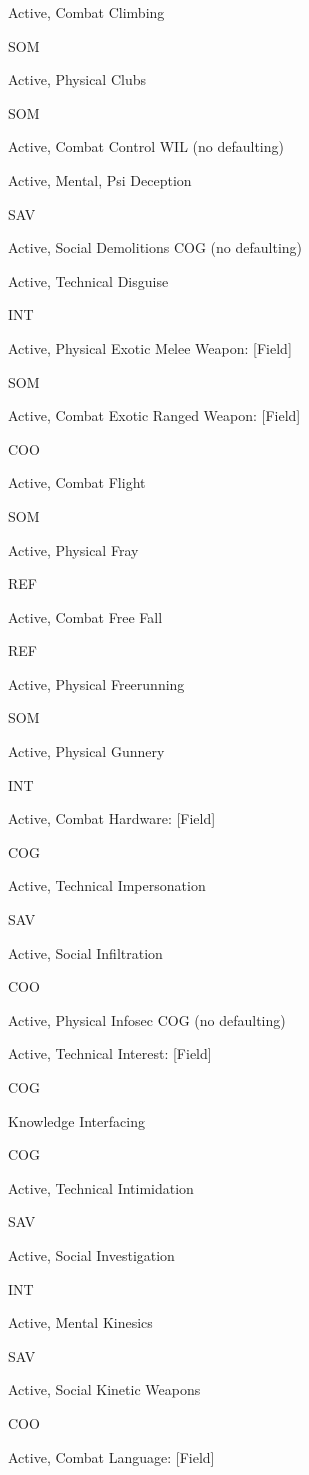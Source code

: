 Active, Combat
Climbing

SOM

Active, Physical
Clubs

SOM

Active, Combat
Control
WIL (no defaulting)

Active, Mental, Psi
Deception

SAV

Active, Social
Demolitions
COG (no defaulting)

Active, Technical
Disguise

INT

Active, Physical
Exotic Melee Weapon: [Field]

SOM

Active, Combat
Exotic Ranged Weapon: [Field]

COO

Active, Combat
Flight

SOM

Active, Physical
Fray

REF

Active, Combat
Free Fall

REF

Active, Physical
Freerunning

SOM

Active, Physical
Gunnery

INT

Active, Combat
Hardware: [Field]

COG

Active, Technical
Impersonation

SAV

Active, Social
Infiltration

COO

Active, Physical
Infosec
COG (no defaulting)

Active, Technical
Interest: [Field]

COG

Knowledge
Interfacing

COG

Active, Technical
Intimidation

SAV

Active, Social
Investigation

INT

Active, Mental
Kinesics

SAV

Active, Social
Kinetic Weapons

COO

Active, Combat
Language: [Field]

